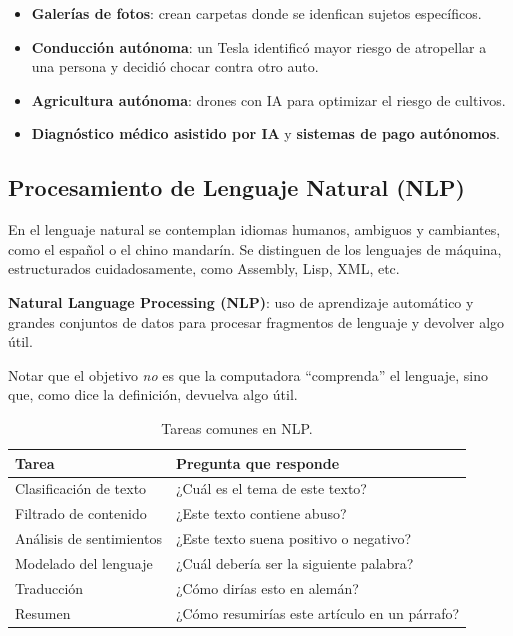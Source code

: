 \begin{itemize}[topsep=2pt,itemsep=1pt]
  \item \textbf{Galerías de fotos}: crean carpetas donde se idenfican sujetos específicos.
  \item \textbf{Conducción autónoma}: un Tesla identificó mayor riesgo de atropellar a una persona y decidió chocar contra otro auto.
  \item \textbf{Agricultura autónoma}: drones con IA para optimizar el riesgo de cultivos.
  \item \textbf{Diagnóstico médico asistido por IA} y \textbf{sistemas de pago autónomos}.
\end{itemize}

\subsection{Procesamiento de Lenguaje Natural (NLP)}

En el lenguaje natural se contemplan idiomas humanos, ambiguos y cambiantes, como el español o el chino mandarín. Se distinguen de los lenguajes de máquina, estructurados cuidadosamente, como Assembly, Lisp, XML, etc.

\begin{definicion}
\textbf{Natural Language Processing (NLP)}: uso de aprendizaje automático y grandes conjuntos de datos para procesar fragmentos de lenguaje y devolver algo útil.
\end{definicion}

Notar que el objetivo \emph{no} es que la computadora ``comprenda'' el lenguaje, sino que, como dice la definición, devuelva algo útil.

\begin{table}[H]
\centering
\caption{Tareas comunes en NLP.}
\label{tab:nlp-tareas}
\small
\begin{tabularx}{\textwidth}{@{}lX@{}}
\toprule
\textbf{Tarea} & \textbf{Pregunta que responde} \\
\midrule
Clasificación de texto & ¿Cuál es el tema de este texto? \\
Filtrado de contenido & ¿Este texto contiene abuso? \\
Análisis de sentimientos & ¿Este texto suena positivo o negativo? \\
Modelado del lenguaje & ¿Cuál debería ser la siguiente palabra? \\
Traducción & ¿Cómo dirías esto en alemán? \\
Resumen & ¿Cómo resumirías este artículo en un párrafo? \\
\bottomrule
\end{tabularx}
\end{table}

